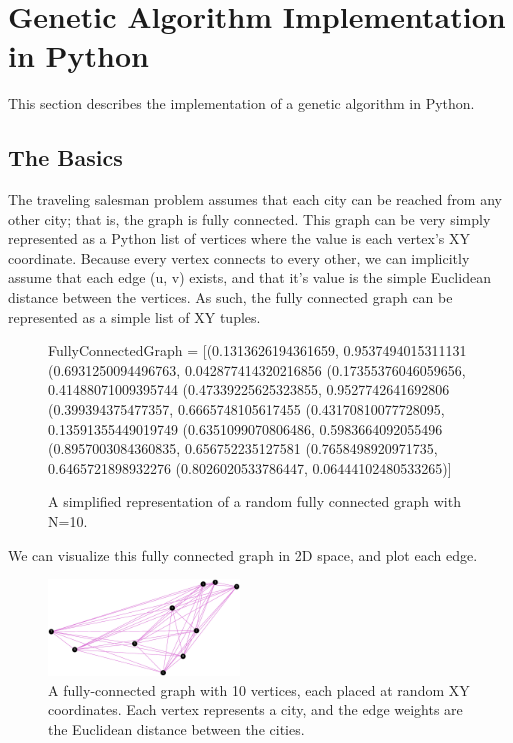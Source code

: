 \section{Genetic Algorithm Implementation in Python}

This section describes the implementation of a genetic algorithm in Python.

\subsection{The Basics}

The traveling salesman problem assumes that each city can be reached from any other city; that is, the graph is fully connected. This graph can be very simply represented as a Python list of vertices where the value is each vertex's XY coordinate. Because every vertex connects to every other, we can implicitly assume that each edge (u, v) exists, and that it's value is the simple Euclidean distance between the vertices. As such, the fully connected graph can be represented as a simple list of XY tuples.

\begin{figure}[H]
\begin{python}
FullyConnectedGraph = [(0.1313626194361659, 0.9537494015311131
 (0.6931250094496763, 0.042877414320216856
 (0.17355376046059656, 0.41488071009395744
 (0.47339225625323855, 0.9527742641692806
 (0.399394375477357, 0.6665748105617455
 (0.43170810077728095, 0.13591355449019749
 (0.6351099070806486, 0.5983664092055496
 (0.8957003084360835, 0.656752235127581
 (0.7658498920971735, 0.6465721898932276
 (0.8026020533786447, 0.06444102480533265)]
\end{python}
\caption{A simplified representation of a random fully connected graph with N=10. }
\end{figure}

We can visualize this fully connected graph in 2D space, and plot each edge. 

\begin{figure}[H]
\centering
\includegraphics[width=2in]{images/fully_connected_graph.eps}
\caption{A fully-connected graph with 10 vertices, each placed at random XY coordinates. Each vertex represents a city, and the edge weights are the Euclidean distance between the cities.}
\end{figure}

